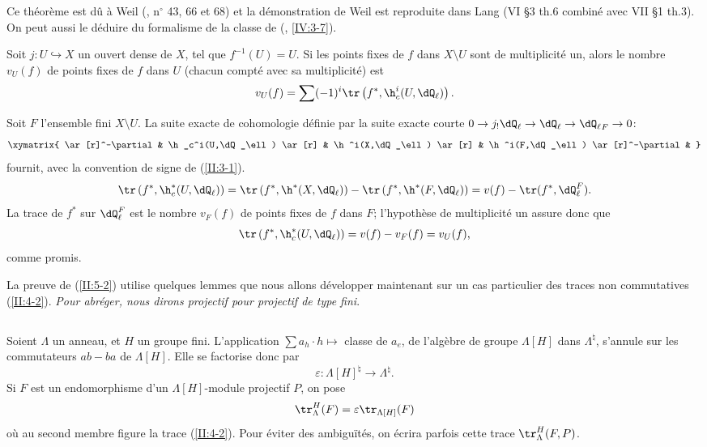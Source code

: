 Ce théorème est dû à Weil (, n$^\circ$ 43, 66 et 68) et la 
démonstration de Weil est reproduite dans Lang  (VI \S3 th.6 combiné 
avec VII \S1 th.3). On peut aussi le déduire du formalisme de la classe de 
 (, \ref{IV:3-7}). 





\begin{corollary_}\label{II:5-4}
Soit $j:U\hookrightarrow X$ un ouvert dense de $X$, tel que $f^{-1}(U)=U$. Si 
les points fixes de $f$ dans $X\setminus U$ sont de multiplicité un, alors le 
nombre $v_U(f)$ de points fixes de $f$ dans $U$ (chacun compté avec sa 
multiplicité) est 
\[
  v_U(f) = \sum (-1)^i \tr\left(f^*,\h_c^i(U,\dQ_\ell)\right) \text{.}
\]
\end{corollary_}

Soit $F$ l'ensemble fini $X\setminus U$. La suite exacte de cohomologie 
définie par la suite exacte courte 
$0\to j_! \dQ_\ell\to\dQ_\ell\to{\dQ_\ell}_F\to 0$: 
\[\xymatrix{
  \ar[r]^-\partial 
    & \h_c^i(U,\dQ_\ell) \ar[r] 
    & \h^i(X,\dQ_\ell) \ar[r] 
    & \h^i(F,\dQ_\ell) \ar[r]^-\partial 
    & 
}\]
fournit, avec la convention de signe de (\ref{II:3-1}). 
\[
  \tr\left(f^*,\h_c^*(U,\dQ_\ell)\right) 
    = \tr\left(f^*,\h^*(X,\dQ_\ell)\right) - \tr\left(f^*,\h^*(F,\dQ_\ell)\right) 
    = v(f) - \tr(f^*,\dQ_\ell^F) \text{.}
\]
La trace de $f^*$ sur $\dQ_\ell^F$ est le nombre $v_F(f)$ de points fixes de 
$f$ dans $F$; l'hypothèse de multiplicité un assure donc que 
\[
  \tr\left(f^*,\h_c^*(U,\dQ_\ell)\right) 
    = v(f) - v_F(f) = v_U(f) \text{,}
\]
comme promis. 

La preuve de (\ref{II:5-2}) utilise quelques lemmes que nous allons 
développer maintenant sur un cas particulier des traces non commutatives 
(\ref{II:4-2}). \emph{Pour abréger, nous dirons projectif pour projectif de 
type fini}. 





\subsection{}\label{II:5-5}

Soient $\Lambda$ un anneau, et $H$ un groupe fini. L'application 
$\sum a_h \cdot h\mapsto $ classe de $a_e$, de l'algèbre de groupe 
$\Lambda[H]$ dans $\Lambda^\natural$, s'annule sur les commutateurs $ab-ba$ de 
$\Lambda[H]$. Elle se factorise donc par 
\[
  \varepsilon : \Lambda[H]^\natural \to \Lambda^\natural \text{.}
\]
Si $F$ est un endomorphisme d'un $\Lambda[H]$-module projectif $P$, on pose 
\[
  \tr_\Lambda^H(F) = \varepsilon \tr_{\Lambda[H]} (F) 
\]
où au second membre figure la trace (\ref{II:4-2}). Pour éviter des 
ambiguïtés, on écrira parfois cette trace $\tr_\Lambda^H(F,P)$. 






